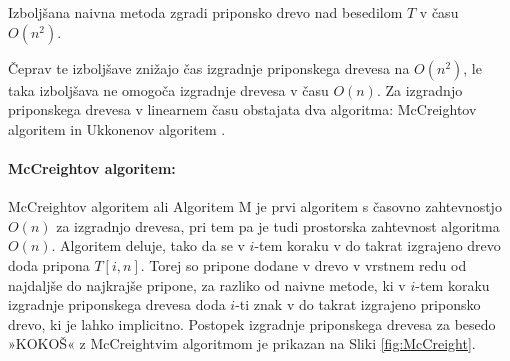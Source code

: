 \begin{izr}\label{izr:naivnaIzbolsana}
    Izboljšana naivna metoda zgradi priponsko drevo nad besedilom $T$ v času $O(n^2)$.
\end{izr}

%

Čeprav te izboljšave znižajo čas izgradnje priponskega drevesa na $O(n^2)$, le taka izboljšava ne omogoča izgradnje drevesa v času $O(n)$. Za izgradnjo priponskega drevesa v linearnem času obstajata dva algoritma: McCreightov algoritem \cite{McCreight1976} in Ukkonenov algoritem \cite{Ukkonen1995}. 

\paragraph{McCreightov algoritem:}
McCreightov algoritem ali Algoritem M je prvi algoritem s časovno zahtevnostjo $O(n)$ za izgradnjo drevesa, pri tem pa je tudi prostorska zahtevnost algoritma $O(n)$.
Algoritem deluje, tako da se v $i$-tem koraku v do takrat izgrajeno drevo doda pripona $T[i,n]$. Torej so pripone dodane v drevo v vrstnem redu od najdaljše do najkrajše pripone, za razliko od naivne metode, ki v $i$-tem koraku izgradnje priponskega drevesa doda $i$-ti znak v do takrat izgrajeno priponsko drevo, ki je lahko implicitno. Postopek izgradnje priponskega drevesa za besedo »KOKOŠ« z McCreightvim algoritmom je prikazan na Sliki \ref{fig:McCreight}.

